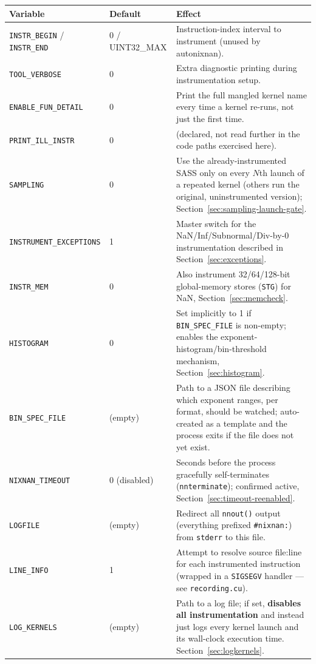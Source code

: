 \documentclass[11pt]{article}
\begin{document}
\begin{longtable}{p{3.2cm}p{2.3cm}p{8.2cm}}
\toprule
\textbf{Variable} & \textbf{Default} & \textbf{Effect} \\
\midrule
\endhead
\texttt{INSTR\_BEGIN} / \texttt{INSTR\_END} & 0 / UINT32\_MAX & Instruction-index interval to instrument (unused by autonixnan). \\
\texttt{TOOL\_VERBOSE} & 0 & Extra diagnostic printing during instrumentation setup. \\
\texttt{ENABLE\_FUN\_DETAIL} & 0 & Print the full mangled kernel name every time a kernel re-runs, not just the first time. \\
\texttt{PRINT\_ILL\_INSTR} & 0 & (declared, not read further in the code paths exercised here). \\
\texttt{SAMPLING} & 0 & Use the already-instrumented SASS only on every $N$th launch of a repeated kernel (others run the original, uninstrumented version); Section~\ref{sec:sampling-launch-gate}. \\
\texttt{INSTRUMENT\_EXCEPTIONS} & 1 & Master switch for the NaN/Inf/Subnormal/Div-by-0 instrumentation described in Section~\ref{sec:exceptions}. \\
\texttt{INSTR\_MEM} & 0 & Also instrument 32/64/128-bit global-memory stores (\texttt{STG}) for NaN, Section~\ref{sec:memcheck}. \\
\texttt{HISTOGRAM} & 0 & Set implicitly to 1 if \texttt{BIN\_SPEC\_FILE} is non-empty; enables the exponent-histogram/bin-threshold mechanism, Section~\ref{sec:histogram}. \\
\texttt{BIN\_SPEC\_FILE} & (empty) & Path to a JSON file describing which exponent ranges, per format, should be watched; auto-created as a template and the process exits if the file does not yet exist. \\
\texttt{NIXNAN\_TIMEOUT} & 0 (disabled) & Seconds before the process gracefully self-terminates (\texttt{nnterminate}); confirmed active, Section~\ref{sec:timeout-reenabled}. \\
\texttt{LOGFILE} & (empty) & Redirect all \texttt{nnout()} output (everything prefixed \texttt{\#nixnan:}) from \texttt{stderr} to this file. \\
\texttt{LINE\_INFO} & 1 & Attempt to resolve source file:line for each instrumented instruction (wrapped in a \texttt{SIGSEGV} handler --- see \texttt{recording.cu}). \\
\texttt{LOG\_KERNELS} & (empty) & Path to a log file; if set, \textbf{disables all instrumentation} and instead just logs every kernel launch and its wall-clock execution time. Section~\ref{sec:logkernels}. \\

\end{longtable}
\end{document}

